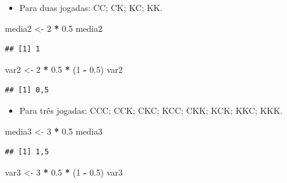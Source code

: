 \documentclass[
]{book}
\newenvironment{Shaded}{\begin{snugshade}}{\end{snugshade}}
\newcommand{\DecValTok}[1]{\textcolor[rgb]{0.00,0.00,0.81}{#1}}
\newcommand{\FloatTok}[1]{\textcolor[rgb]{0.00,0.00,0.81}{#1}}
\newcommand{\NormalTok}[1]{#1}
\newcommand{\OperatorTok}[1]{\textcolor[rgb]{0.81,0.36,0.00}{\textbf{#1}}}
\newcommand{\StringTok}[1]{\textcolor[rgb]{0.31,0.60,0.02}{#1}}
\providecommand{\tightlist}{%
  \setlength{\itemsep}{0pt}\setlength{\parskip}{0pt}}
\begin{document}
\begin{itemize}
\tightlist
\item
  Para duas jogadas: CC; CK; KC; KK.
\end{itemize}

\begin{Shaded}
\begin{Highlighting}[]
\NormalTok{media2 <-}\StringTok{ }\DecValTok{2} \OperatorTok{*}\StringTok{ }\FloatTok{0.5}
\NormalTok{media2}
\end{Highlighting}
\end{Shaded}

\begin{verbatim}
## [1] 1
\end{verbatim}

\begin{Shaded}
\begin{Highlighting}[]
\NormalTok{var2 <-}\StringTok{ }\DecValTok{2} \OperatorTok{*}\StringTok{ }\FloatTok{0.5} \OperatorTok{*}\StringTok{ }\NormalTok{(}\DecValTok{1} \OperatorTok{-}\StringTok{ }\FloatTok{0.5}\NormalTok{)}
\NormalTok{var2}
\end{Highlighting}
\end{Shaded}

\begin{verbatim}
## [1] 0,5
\end{verbatim}

\begin{itemize}
\tightlist
\item
  Para três jogadas: CCC; CCK; CKC; KCC; CKK; KCK; KKC; KKK.
\end{itemize}

\begin{Shaded}
\begin{Highlighting}[]
\NormalTok{media3 <-}\StringTok{ }\DecValTok{3} \OperatorTok{*}\StringTok{ }\FloatTok{0.5}
\NormalTok{media3}
\end{Highlighting}
\end{Shaded}

\begin{verbatim}
## [1] 1,5
\end{verbatim}

\begin{Shaded}
\begin{Highlighting}[]
\NormalTok{var3 <-}\StringTok{ }\DecValTok{3} \OperatorTok{*}\StringTok{ }\FloatTok{0.5} \OperatorTok{*}\StringTok{ }\NormalTok{(}\DecValTok{1} \OperatorTok{-}\StringTok{ }\FloatTok{0.5}\NormalTok{)}
\NormalTok{var3}
\end{Highlighting}
\end{Shaded}
\end{document}
